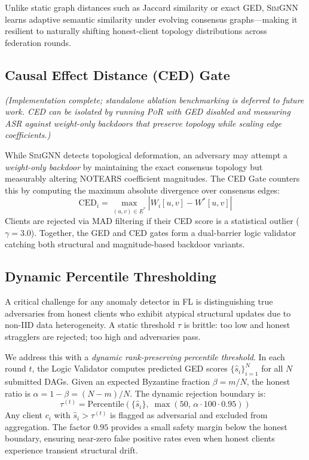 \documentclass[journal]{IEEEtran}
\newcommand{\por}{\textsc{PoR}}
\newcommand{\simgnn}{\textsc{SimGNN}}
\begin{document}
Unlike static graph distances such as Jaccard similarity or exact GED,
\simgnn{} learns adaptive semantic similarity under evolving consensus
graphs---making it resilient to naturally shifting honest-client topology
distributions across federation rounds.

\subsection{Causal Effect Distance (CED) Gate}
\label{sec:ced}

\textit{(Implementation complete; standalone ablation benchmarking is deferred
to future work. CED can be isolated by running \por{} with GED disabled and
measuring ASR against weight-only backdoors that preserve topology while
scaling edge coefficients.)}

While \simgnn{} detects topological deformation, an adversary may attempt a
\textit{weight-only backdoor} by maintaining the exact consensus topology
but measurably altering NOTEARS coefficient magnitudes. The CED Gate
counters this by computing the maximum absolute divergence over consensus
edges:
\begin{equation}
  \text{CED}_i = \max_{(u,v) \in E^*} \left| W_i[u,v] - W^*[u,v] \right|
\end{equation}
Clients are rejected via MAD filtering if their CED score is a statistical
outlier ($\gamma = 3.0$). Together, the GED and CED gates form a dual-barrier
logic validator catching both structural and magnitude-based backdoor variants.

\subsection{Dynamic Percentile Thresholding}
\label{sec:threshold}

A critical challenge for any anomaly detector in FL is distinguishing
true adversaries from honest clients who exhibit atypical structural updates
due to non-IID data heterogeneity. A static threshold $\tau$ is brittle:
too low and honest stragglers are rejected; too high and adversaries pass.

We address this with a \textit{dynamic rank-preserving percentile threshold}.
In each round $t$, the Logic Validator computes predicted GED scores
$\{\hat{s}_i\}_{i=1}^N$ for all $N$ submitted DAGs. Given an expected
Byzantine fraction $\beta = m/N$, the honest ratio is
$\alpha = 1 - \beta = (N-m)/N$. The dynamic rejection boundary is:
\begin{equation}
  \tau^{(t)} = \mathrm{Percentile}\!\left(\{\hat{s}_i\},\;
  \max(50,\, \alpha \cdot 100 \cdot 0.95)\right)
  \label{eq:threshold}
\end{equation}
Any client $c_i$ with $\hat{s}_i > \tau^{(t)}$ is flagged as adversarial
and excluded from aggregation. The factor $0.95$ provides a small safety
margin below the honest boundary, ensuring near-zero false positive rates
even when honest clients experience transient structural drift.
\end{document}

